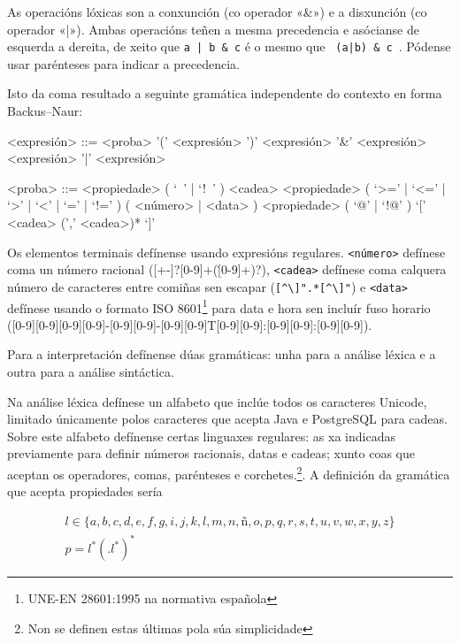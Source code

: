 \newpage

As operacións lóxicas son a conxunción (co operador «\&») e a disxunción (co operador «|»). Ambas operacións teñen a mesma precedencia e asócianse de esquerda a dereita, de xeito que \texttt{a | b \& c} é o mesmo que \texttt{ (a|b) \& c }. Pódense usar parénteses para indicar a precedencia.

Isto da coma resultado a seguinte gramática independente do contexto en forma Backus–Naur:

\begin{grammar}
	<expresión> ::= <proba>
	\alt '(' <expresión> ')'
	\alt <expresión> '\&' <expresión>
	\alt <expresión> '|' <expresión>
	
	<proba> ::= <propiedade> ( `~' | `!~' ) <cadea>
	\alt <propiedade> ( `>=' | `<=' | `>' | `<' | `=' | `!=' ) ( <número> | <data> )
	\alt <propiedade> ( `@' | `!@' ) `[' <cadea> (',' <cadea>)* `]'
\end{grammar}

Os elementos terminais defínense usando expresións regulares. \texttt{<número>} defínese coma un número racional ([+-]?[0-9]+\allowbreak{}(\.[0-9]+)?), \texttt{<cadea>} defínese coma calquera número de caracteres entre comiñas sen escapar (\verb|[^\]".*[^\]"|) e \texttt{<data>} defínese usando o formato ISO 8601\footnote{UNE-EN 28601:1995 na normativa española\cite{iso8601}} para data e hora sen incluír fuso horario ([0-9][0-9][0-9][0-9]-\allowbreak{}[0-9][0-9]-\allowbreak{}[0-9][0-9]T\allowbreak{}[0-9][0-9]:\allowbreak{}[0-9][0-9]:\allowbreak{}[0-9][0-9]).

Para a interpretación defínense dúas gramáticas: unha para a análise léxica e a outra para a análise sintáctica.

Na análise léxica defínese un alfabeto que inclúe todos os caracteres Unicode, limitado únicamente polos caracteres que acepta Java e PostgreSQL para cadeas. Sobre este alfabeto defínense certas linguaxes regulares: as xa indicadas previamente para definir números racionais, datas e cadeas; xunto coas que aceptan os operadores, comas, parénteses e corchetes.\footnote{Non se definen estas últimas pola súa simplicidade}. A definición da gramática que acepta propiedades sería

\begin{eqnarray}
l \in \{ a,b,c,d,e,f,g,i,j,k,l,m,n,ñ,o,p,q,r,s,t,u,v,w,x,y,z \} \\
p = l^{\ast}(.l^{\ast})^{\ast} 
\end{eqnarray}

\newpage

